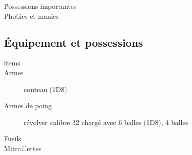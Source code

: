\documentclass[11pt]{article}
\begin{document}
\begin{twocols}
\begin{description}
\item[{Possessions importantes}] 

\item[{Phobies et manies}] 
\end{description}

\subsection{Équipement et possessions}
\label{sec:orgcf7a98e}

\begin{description}
\item[{items}] 

\item[{Armes}] couteau (1D8)
\item[{Armes de poing}] révolver calibre 32 chargé avec 6 balles (1D8), 4 balles
\item[{Fusils}] 

\item[{Mitraillettes}] 
\end{description}


\end{twocols}
\pagebreak
\end{document}
